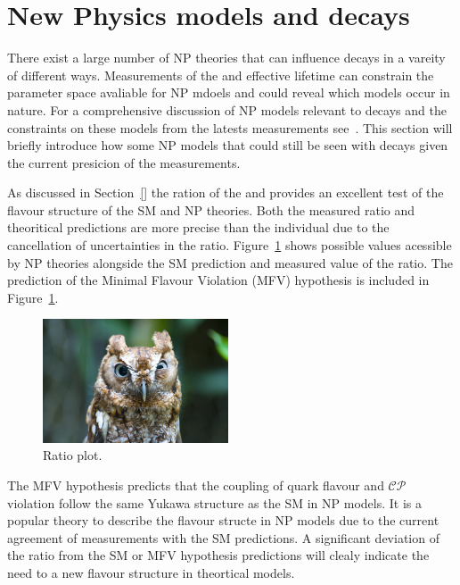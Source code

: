 \section{New Physics models and \bmumu decays}
\label{sec:NPmodels}
There exist a large number of NP theories that can influence \bmumu decays in a vareity of different ways. Measurements of the \bmumu \BFs and \bsmumu effective lifetime can constrain the parameter space avaliable for NP mdoels and could reveal which models occur in nature. For a comprehensive discussion of NP models relevant to \bmumu decays and the constraints on these models from the latests \BF measurements see~\cite{}. This section will briefly introduce how some NP models that could still be seen with \bmumu decays given the current presicion of the \BF measurements. %

As discussed in Section~\ref{} the ration of the \bdmumu and \bsmumu \Bfs provides an excellent test of the flavour structure of the SM and NP theories. Both the measured ratio and theoritical predictions are more precise than the individual \BFs due to the cancellation of uncertainties in the ratio. Figure~\ref{fig:ratio} shows possible values acessible by NP theories alongside the SM prediction and measured value of the \BF ratio. The prediction of the Minimal Flavour Violation (MFV) hypothesis is included in Figure~\ref{fig:ratio}. 
\begin{figure}[htbp]
    \centering
        \includegraphics[width=0.49\textwidth]{./Figs/placeholder.jpeg}
    \caption{Ratio plot.}
    \label{fig:ratio}
\end{figure}
The MFV hypothesis predicts that the coupling of quark flavour and $\mathcal{CP}$ violation follow the same Yukawa structure as the SM in NP models. It is a popular theory to describe the flavour structe in NP models due to the current agreement of measurements with the SM predictions. A significant deviation of the \BF ratio from the SM or MFV hypothesis predictions will clealy indicate the need to a new flavour structure in theortical models.

